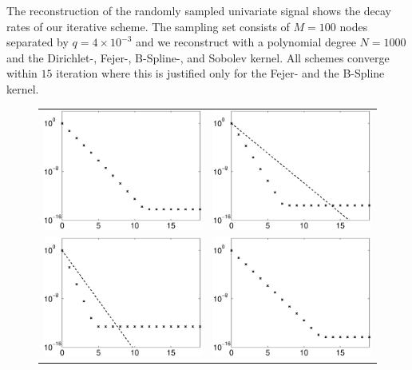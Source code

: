 \documentclass[11pt,a4paper,bibtotoc]{scrartcl}
\numberwithin{equation}{section}
\numberwithin{table}{section}
\numberwithin{figure}{section}
\begin{document}
The reconstruction of the randomly sampled univariate signal shows the decay
rates of our iterative scheme.
The sampling set consists of $M=100$ nodes separated by $q=4\times 10^{-3}$ and we
reconstruct with a polynomial degree $N=1000$ and the Dirichlet-, Fejer-,
B-Spline-, and Sobolev kernel.
All schemes converge within $15$ iteration where this is justified only for
the Fejer- and the B-Spline kernel.

\begin{figure}[ht]
  \begin{center}
    \begin{tabular}{cc}
      \includegraphics[width=6cm]{images/error_decay_4_0.eps} &
      \includegraphics[width=6cm]{images/error_decay_4_1.eps} \\
      \includegraphics[width=6cm]{images/error_decay_4_2.eps} &
      \includegraphics[width=6cm]{images/error_decay_4_3.eps} 

\end{tabular}
\end{center}
\end{figure}
\end{document}
